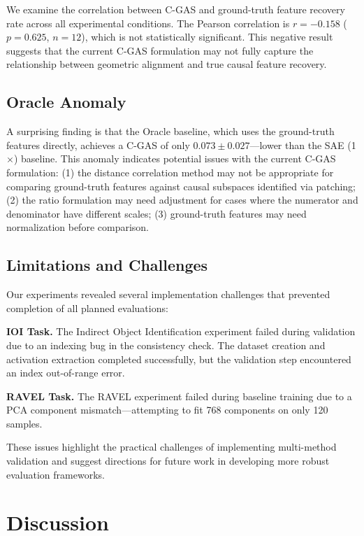 \documentclass{article}
\begin{document}
We examine the correlation between C-GAS and ground-truth feature recovery rate across all experimental conditions. The Pearson correlation is $r = -0.158$ ($p = 0.625$, $n=12$), which is not statistically significant. This negative result suggests that the current C-GAS formulation may not fully capture the relationship between geometric alignment and true causal feature recovery.

\subsection{Oracle Anomaly}

A surprising finding is that the Oracle baseline, which uses the ground-truth features directly, achieves a C-GAS of only $0.073 \pm 0.027$---lower than the SAE (1$\times$) baseline. This anomaly indicates potential issues with the current C-GAS formulation: (1) the distance correlation method may not be appropriate for comparing ground-truth features against causal subspaces identified via patching; (2) the ratio formulation may need adjustment for cases where the numerator and denominator have different scales; (3) ground-truth features may need normalization before comparison.

\subsection{Limitations and Challenges}

Our experiments revealed several implementation challenges that prevented completion of all planned evaluations:

\textbf{IOI Task.} The Indirect Object Identification experiment failed during validation due to an indexing bug in the consistency check. The dataset creation and activation extraction completed successfully, but the validation step encountered an index out-of-range error.

\textbf{RAVEL Task.} The RAVEL experiment failed during baseline training due to a PCA component mismatch---attempting to fit 768 components on only 120 samples.

These issues highlight the practical challenges of implementing multi-method validation and suggest directions for future work in developing more robust evaluation frameworks.

\section{Discussion}
\end{document}
